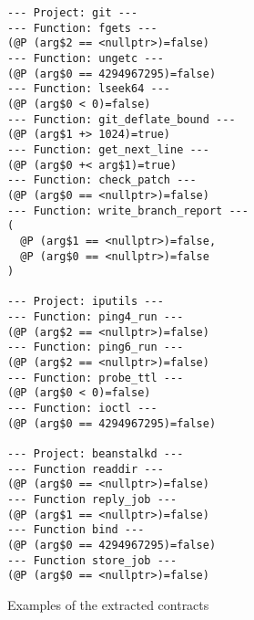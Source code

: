 \begin{figure*}[tbh]

\caption{Examples of the extracted contracts}
\label{fig:extracted-contracts}

\begin{lstlisting}[style=PS,multicols=2]
--- Project: git ---
--- Function: fgets ---
(@P (arg$2 == <nullptr>)=false)
--- Function: ungetc ---
(@P (arg$0 == 4294967295)=false)
--- Function: lseek64 ---
(@P (arg$0 < 0)=false)
--- Function: git_deflate_bound ---
(@P (arg$1 +> 1024)=true)
--- Function: get_next_line ---
(@P (arg$0 +< arg$1)=true)
--- Function: check_patch ---
(@P (arg$0 == <nullptr>)=false)
--- Function: write_branch_report ---
(
  @P (arg$1 == <nullptr>)=false,
  @P (arg$0 == <nullptr>)=false
)

--- Project: iputils ---
--- Function: ping4_run ---
(@P (arg$2 == <nullptr>)=false)
--- Function: ping6_run ---
(@P (arg$2 == <nullptr>)=false)
--- Function: probe_ttl ---
(@P (arg$0 < 0)=false)
--- Function: ioctl ---
(@P (arg$0 == 4294967295)=false)

--- Project: beanstalkd ---
--- Function readdir ---
(@P (arg$0 == <nullptr>)=false)
--- Function reply_job ---
(@P (arg$1 == <nullptr>)=false)
--- Function bind ---
(@P (arg$0 == 4294967295)=false)
--- Function store_job ---
(@P (arg$0 == <nullptr>)=false)

\end{lstlisting}
\end{figure*}
